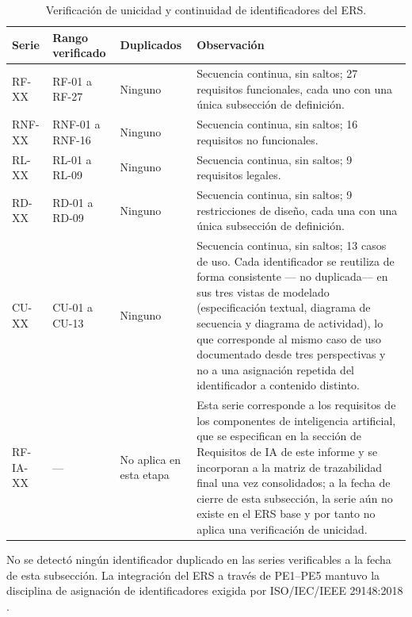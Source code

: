 \documentclass[journal,onecolumn]{IEEEtran}
\begin{document}
	\begin{table}[H]
		\centering
		\caption{Verificación de unicidad y continuidad de identificadores del ERS.}
		\label{tab:unicidad-ids}
		\renewcommand{\arraystretch}{1.3}
		\begin{tabularx}{\textwidth}{
				|>{\raggedright\arraybackslash}p{2.2cm}
				|>{\raggedright\arraybackslash}p{2.6cm}
				|>{\raggedright\arraybackslash}p{2.2cm}
				|>{\raggedright\arraybackslash}X|}
			\hline
			\textbf{Serie} & \textbf{Rango verificado} & \textbf{Duplicados} & \textbf{Observación} \\
			\hline
			RF-XX & RF-01 a RF-27 & Ninguno & Secuencia continua, sin saltos; 27 requisitos funcionales, cada uno con una única subsección de definición. \\
			\hline
			RNF-XX & RNF-01 a RNF-16 & Ninguno & Secuencia continua, sin saltos; 16 requisitos no funcionales. \\
			\hline
			RL-XX & RL-01 a RL-09 & Ninguno & Secuencia continua, sin saltos; 9 requisitos legales. \\
			\hline
			RD-XX & RD-01 a RD-09 & Ninguno & Secuencia continua, sin saltos; 9 restricciones de diseño, cada una con una única subsección de definición. \\
			\hline
			CU-XX & CU-01 a CU-13 & Ninguno & Secuencia continua, sin saltos; 13 casos de uso. Cada identificador se reutiliza de forma consistente --- no duplicada--- en sus tres vistas de modelado (especificación textual, diagrama de secuencia y diagrama de actividad), lo que corresponde al mismo caso de uso documentado desde tres perspectivas y no a una asignación repetida del identificador a contenido distinto. \\
			\hline
			RF-IA-XX & --- & No aplica en esta etapa & Esta serie corresponde a los requisitos de los componentes de inteligencia artificial, que se especifican en la sección de Requisitos de IA de este informe y se incorporan a la matriz de trazabilidad final una vez consolidados; a la fecha de cierre de esta subsección, la serie aún no existe en el ERS base y por tanto no aplica una verificación de unicidad. \\
			\hline
		\end{tabularx}
	\end{table}
	
	No se detectó ningún identificador duplicado en las series verificables a la
	fecha de esta subsección. La integración del ERS a través de PE1--PE5
	mantuvo la disciplina de asignación de identificadores exigida por
	ISO/IEC/IEEE 29148:2018 \cite{ieee29148}.
	\newpage
	
\end{document}
